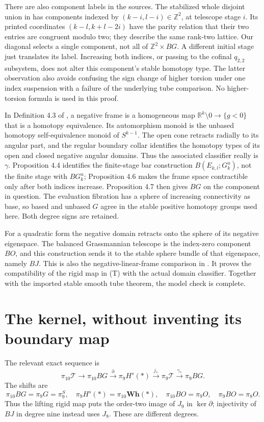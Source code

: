 \documentclass[11pt]{article}
\theoremstyle{remark}
\newcommand{\R}{\mathbb R}
\newcommand{\Z}{\mathbb Z}
\newcommand{\T}{\mathcal T}
\newcommand{\Hs}{H^s}
\begin{document}
There are also component labels in the sources. The stabilized whole
disjoint union in \cite{AAGCK} has components indexed by
\((k-i,l-i)\in\Z^2\), at telescope stage \(i\). Its printed coordinates
\((k-l,k+l-2i)\) have the parity relation that their two entries are
congruent modulo two; they describe the same rank-two lattice.
Our diagonal selects a single component, not all of
\(\Z^2\times BG\). A different initial stage just translates its
label. Increasing both indices, or passing to the cofinal
\(q_{2,2}\) subsystem, does not alter this component's stable
homotopy type. The latter observation also avoids confusing the
sign change of higher torsion under one index suspension with a
failure of the underlying tube comparison. No higher-torsion
formula is used in this proof.

In Definition 4.3 of \cite{AAGCK}, a negative frame is a homogeneous
map \(\R^k\setminus0\to\{g<0\}\) that is a homotopy equivalence.
Its automorphism monoid is the unbased homotopy self-equivalence
monoid of \(S^{k-1}\). The open cone retracts radially to its angular
part, and the regular boundary collar identifies the homotopy types
of its open and closed negative angular domains. Thus the associated
classifier really is \(\gamma\). Proposition 4.4 identifies the
finite-stage bar construction \(B(E_{k,l};G_k^u)\), not the finite
stage with \(BG_k^u\); Proposition 4.6 makes the frame space
contractible only after both indices increase. Proposition 4.7 then
gives \(BG\) on the component in question.
The evaluation fibration has a sphere of increasing connectivity as
base, so based and unbased \(G\) agree in the stable positive
homotopy groups used here. Both degree signs are retained.

For a quadratic form the negative domain retracts onto the sphere
of its negative eigenspace. The balanced Grassmannian telescope
is the index-zero component \(BO\), and this construction sends
it to the stable sphere bundle of that eigenspace, namely \(BJ\).
This is also the negative-linear-frame comparison in
\cite[Proposition 4.8]{AAGCK}. It proves the compatibility of the
rigid map in (T) with the actual domain classifier. Together with
the imported stable smooth tube theorem, the model check is complete.

\section{The kernel, without inventing its boundary map}
The relevant exact sequence is
\begin{equation}\label{eq:les}
 \pi_{10}\T\longrightarrow\pi_{10}BG
 \xrightarrow{\partial}\pi_9\Hs(*)
 \xrightarrow{j_*}\pi_9\T\xrightarrow{\gamma_*}\pi_9BG.
\end{equation}
The shifts are
\[
 \pi_{10}BG=\pi_9G=\pi_9^S,\quad
 \pi_9\Hs(*)=\pi_{10}\mathbf{Wh}(*),\quad
 \pi_{10}BO=\pi_9O,\quad \pi_9BO=\pi_8O.
\]
Thus the lifting rigid map puts the order-two image of \(J_9\)
in \(\ker\partial\); injectivity of \(BJ\) in degree nine instead
uses \(J_8\). These are different degrees.
\end{document}
